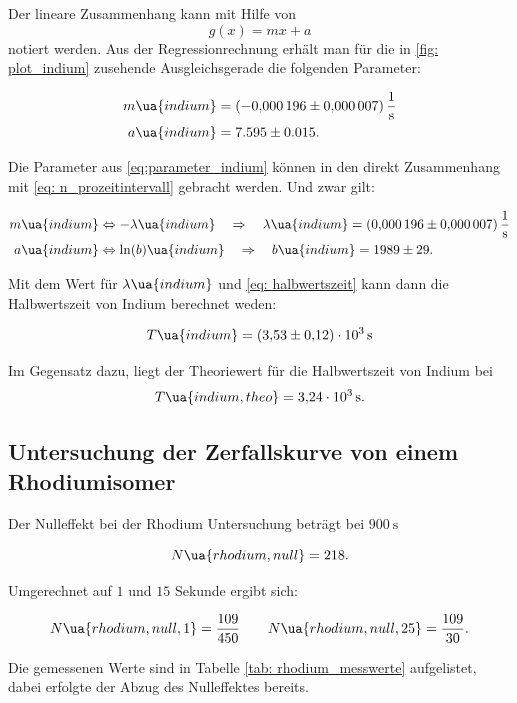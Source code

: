 Der lineare Zusammenhang kann mit Hilfe von
\begin{equation*}
  g(x)=mx+a
\end{equation*}
notiert werden.
Aus der Regressionrechnung erhält man für die in \ref{fig: plot_indium} zusehende
Ausgleichsgerade die folgenden Parameter:

\begin{align}
  \label{eq:parameter_indium}
  \begin{aligned}
    m\ua{indium}&=\SI{-0.000196\pm0.000007}{\per\second}\\
    a\ua{indium}&=7.595\pm0.015.
  \end{aligned}
\end{align}

Die Parameter aus \eqref{eq:parameter_indium} können in den direkt Zusammenhang mit
\eqref{eq: n_prozeitintervall} gebracht werden. Und zwar gilt:

\begin{align}
  \label{eq:parameter_indium}
  \begin{aligned}
    m\ua{indium}&\Leftrightarrow -\lambda\ua{indium} \quad \Rightarrow \quad \lambda\ua{indium}=\SI{0.000196\pm0.000007}{\per\second}\\
    a\ua{indium}&\Leftrightarrow \ln(b)\ua{indium} \quad \Rightarrow \quad b\ua{indium} =1989\pm 29.
  \end{aligned}
\end{align}

Mit dem Wert für $\lambda\ua{indium}$ und \eqref{eq: halbwertszeit} kann dann die Halbwertszeit von Indium
berechnet weden:

\begin{equation}
  \label{eq:halbwertzeit_indium}
  T\ua{indium}=\SI{3.53\pm0.12 e+3}{\second}
\end{equation}

Im Gegensatz dazu, liegt der Theoriewert für die Halbwertszeit von Indium\cite{indium_halb} bei
\begin{equation}
  \label{eq:halbwertzeit_indium_theo}
  T\ua{indium,theo}=\SI{3.24 e+3}{\second}.
\end{equation}

\subsection{Untersuchung der Zerfallskurve von einem Rhodiumisomer}

Der Nulleffekt bei der Rhodium Untersuchung beträgt bei $\SI{900}{\second}$

\begin{equation*}
  N\ua{rhodium,null}=218.
\end{equation*}

Umgerechnet auf $1$ und $15$ Sekunde ergibt sich:

\begin{equation*}
    N\ua{rhodium,null,1}=\frac{109}{450} \qquad N\ua{rhodium,null,25}=\frac{109}{30}.
\end{equation*}

Die gemessenen Werte sind in Tabelle \ref{tab: rhodium_messwerte} aufgelistet, dabei erfolgte
der Abzug des Nulleffektes bereits.

